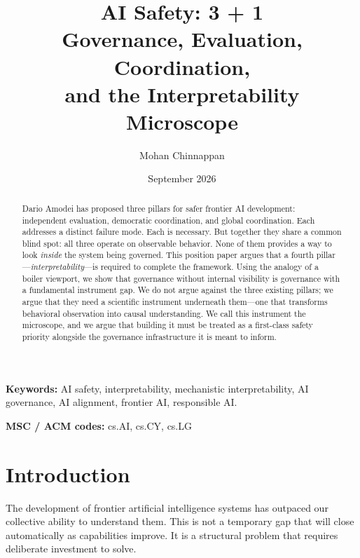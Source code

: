 \documentclass[12pt]{article}
\begin{document}
\title{\textbf{AI Safety: 3 + 1}\\
  \large Governance, Evaluation, Coordination,\\
  and the Interpretability Microscope}

\author{Mohan Chinnappan}

\date{September 2026}

\maketitle
\thispagestyle{empty}

\begin{abstract}
Dario Amodei has proposed three pillars for safer frontier AI development:
independent evaluation, democratic coordination, and global coordination.
Each addresses a distinct failure mode. Each is necessary. But together they
share a common blind spot: all three operate on observable behavior. None of
them provides a way to look \emph{inside} the system being governed. This
position paper argues that a fourth pillar---\emph{interpretability}---is
required to complete the framework. Using the analogy of a boiler viewport,
we show that governance without internal visibility is governance with a
fundamental instrument gap. We do not argue against the three existing
pillars; we argue that they need a scientific instrument underneath them---one
that transforms behavioral observation into causal understanding. We call this
instrument the microscope, and we argue that building it must be treated as a
first-class safety priority alongside the governance infrastructure it is
meant to inform.
\end{abstract}

\bigskip
\textbf{Keywords:} AI safety, interpretability, mechanistic interpretability,
AI governance, AI alignment, frontier AI, responsible AI.

\bigskip
\noindent\textbf{MSC / ACM codes:} cs.AI, cs.CY, cs.LG

\newpage
\setcounter{page}{1}
\onehalfspacing

\section{Introduction}
\label{sec:intro}

The development of frontier artificial intelligence systems has outpaced our
collective ability to understand them. This is not a temporary gap that will
close automatically as capabilities improve. It is a structural problem that
requires deliberate investment to solve.
\end{document}
